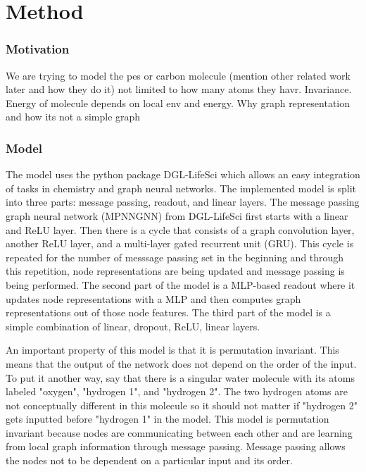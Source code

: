\documentclass[12pt, abstract = true]{scrartcl}
\begin{document}
\newpage 

\section{Method}
\subsubsection{Motivation}
We are trying to model the pes or carbon molecule (mention other related work later and how they do it) not limited to how many atoms they havr. Invariance. Energy of molecule depends on local env and energy. Why graph representation and how its not a simple graph

\subsubsection{Model} 
The model uses the python package DGL-LifeSci\cite{dgllife} which allows an easy integration of tasks in 
chemistry and graph neural networks. The implemented model is split into three parts: message passing, 
readout, and linear layers. The message passing graph neural network (MPNNGNN) from DGL-LifeSci first starts 
with a linear and ReLU layer. Then there is a cycle that consists of a graph convolution layer, another 
ReLU layer, and a multi-layer gated recurrent unit (GRU). This cycle is repeated for the number of 
messsage passing set in the beginning and through this repetition, node representations are being updated 
and message passing is being performed. The second part of the model is a MLP-based readout where it 
updates node representations with a MLP and then computes graph representations out of those node features. 
The third part of the model is a simple combination of linear, dropout, ReLU, linear layers.

An important property of this model is that it is permutation invariant. This means that the output of 
the network does not depend on the order of the input. To put it another way, say that there is a singular
water molecule with its atoms labeled "oxygen", "hydrogen 1", and "hydrogen 2". The two hydrogen atoms 
are not conceptually different in this molecule so it should not matter if "hydrogen 2" gets inputted 
before "hydrogen 1" in the model. This model is permutation invariant because nodes are communicating 
between each other and are learning from local graph information through message passing. Message passing 
allows the nodes not to be dependent on a particular input and its order.
\end{document}
